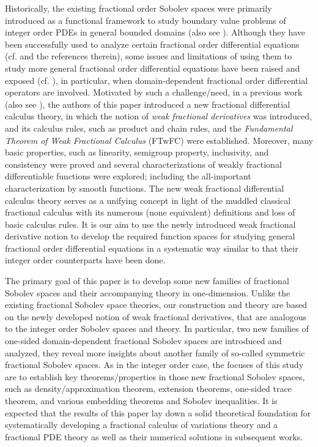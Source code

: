 \documentclass[leqno,final]{siamltex}
\numberwithin{equation}{section}
\renewcommand{\(}{\bigl(}
\renewcommand{\)}{\bigr)}
\begin{document}
     Historically, the existing fractional order Sobolev spaces were primarily introduced as 
     a functional framework to study boundary value problems of integer order PDEs in general 
     bounded domains \cite{Lions} (also see \cite{Adams,Nezza,Evans}). Although they have been 
     successfully used to analyze certain 
     fractional order differential equations (cf. \cite{Caffarelli07,Du19,Ervin,Du19,Guo,Podlubny} and the references therein), some issues and limitations of using them to study more general 
     fractional order differential equations have been raised and exposed (cf. \cite{Malinowska,Samko}), in particular, when domain-dependent fractional 
     order differential operators are involved. 
     Motivated by such a challenge/need, in a previous work \cite{Feng_Sutton1} (also see \cite{Feng_Sutton}), the authors of 
     this paper introduced a new fractional differential calculus theory, in which the notion of \textit{weak fractional derivatives} was introduced, and its calculus rules, such as product 
     and chain rules, and the \textit{Fundamental Theorem of Weak Fractional Calculus} (FTwFC) 
     were established. Moreover, 
     many basic properties, such as linearity, semigroup property, inclusivity, and consistency
     were proved and several characterizations of weakly fractional differentiable functions 
     were explored; including the all-important characterization by smooth functions. The new 
     weak fractional differential calculus theory serves as a unifying concept in light of 
     the muddled classical fractional calculus with its numerous (none equivalent) definitions 
     and loss of basic calculus rules. It is our aim to use the newly introduced weak 
     fractional derivative notion to develop the required function spaces for studying 
     general fractional order differential equations in a systematic way similar to that their
     integer order counterparts have been done.
 
    The primary goal of this paper is to develop some new families of fractional Sobolev 
    spaces and their accompanying theory in one-dimension. Unlike the existing 
    fractional Sobolev space theories,  our construction 
    and theory are based on the newly developed notion of weak fractional derivatives, 
    that are analogous to the integer order Sobolev spaces and theory. In particular, 
    two new families of one-sided domain-dependent fractional 
    Sobolev spaces are introduced and analyzed, they reveal more insights about another family of   
    so-called symmetric fractional Sobolev spaces. As in the integer order case, 
    the focuses of this study are to establish key theorems/properties in those new fractional 
    Sobolev spaces, such as density/approximation theorem, extension theorems, 
    one-sided trace theorem, and various embedding theorems and Sobolev inequalities. 
    It is expected that the results of this paper lay down a solid theoretical foundation 
    for systematically developing a fractional calculus of 
    variations theory and a fractional PDE theory as well as their numerical 
    solutions in subsequent works. %
    
\end{document}
